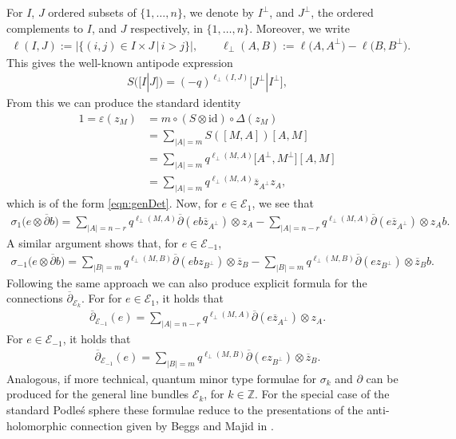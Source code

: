 \documentclass[10pt,a4paper]{amsart}
\numberwithin{equation}{section}
\newcommand{\e}{\varepsilon}
\newcommand\del{\partial}
\newcommand\adel{\overline{\partial}}
\begin{document}
For $I$, $J$ ordered subsets of $\{1,\dots ,n\}$, we denote by $I^{\perp}$, and $J^{\perp}$, the ordered complements to $I$, and $J$ respectively, in $\{1,\dots, n\}$. Moreover, we write
\begin{gather*}
\ell(I,J):= |\{(i,j)\in I\times J \,| \, i>j\}|, \qquad \ell_{\perp}(A,B) := \ell\big(A,A^{\perp}\big) - \ell\big(B,B^{\perp}\big).
\end{gather*}
This gives the well-known antipode expression
\begin{gather*}
S([I|J]) = (-q)^{\ell_{\perp}(I,J)}\big[{J^\perp}|{I^\perp}\big],
\end{gather*}
From this we can produce the standard identity
\begin{align*}
1 = \e(z_M) &= m \circ (S \otimes \mathrm{id}) \circ \Delta(z_M)\\
& = \sum_{|A| = m} S([M,A])[A,M]\\
& = \sum_{|A| = m} q^{\ell_{\perp}(M,A)} \big[A^{\perp},M^{\perp}\big][A,M]\\
& = \sum_{|A| = m} q^{\ell_{\perp}(M,A)} \overline{z}_{A^{\perp}}z_A,
\end{align*}
which is of the form \eqref{eqn:genDet}. Now, for $e \in \mathcal{E}_1$, we see that
\begin{gather*}
\sigma_1\big(e \otimes \adel b\big) = \sum_{|A|=n-r} q^{\ell_{\perp}(M,A)} \adel(eb\overline{z}_{A^{\perp}}) \otimes z_A- \sum_{|A|=n-r} q^{\ell_{\perp}(M,A)} \adel(e\overline{z}_{A^{\perp}}) \otimes z_Ab.
\end{gather*}
A similar argument shows that, for $e \in \mathcal{E}_{-1}$,
\begin{gather*}
\sigma_{-1}\big(e \otimes \adel b\big) = \sum_{|B|=m} q^{\ell_{\perp}(M,B)} \adel(ebz_{B^{\perp}}) \otimes \overline{z}_B - \sum_{|B|=m} q^{\ell_{\perp}(M,B)} \adel(ez_{B^{\perp}}) \otimes \overline{z}_Bb.
\end{gather*}
Following the same approach we can also produce explicit formula for the connections $\adel_{\mathcal{E}_k}$. For for $e \in \mathcal{E}_1$, it holds that
\begin{gather*}
\adel_{\mathcal{E}_{-1}}(e) = \sum_{|A|=n-r} q^{\ell_{\perp}(M,A)} \adel(e\overline{z}_{A^{\perp}}) \otimes z_A.
\end{gather*}
For $e \in \mathcal{E}_{-1}$, it holds that
\begin{gather*}
\adel_{\mathcal{E}_{-1}}(e) = \sum_{|B|=m} q^{\ell_{\perp}(M,B)} \adel(ez_{B^{\perp}}) \otimes \overline{z}_B.
\end{gather*}
Analogous, if more technical, quantum minor type formulae for $\sigma_k$ and $\del$ can be produced for the general line bundles $\mathcal{E}_k$, for $k \in \mathbb{Z}$. For the special case of the standard Podle\'s sphere these formulae reduce to the presentations of the anti-holomorphic connection given by Beggs and Majid in \cite[Example~5.23]{BeggsMajid:Leabh}.
\end{document}
